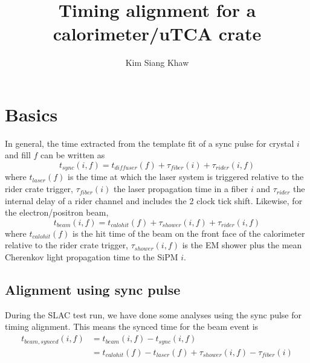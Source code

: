 \documentclass[12pt,letterpaper]{article}
\title{Timing alignment for a calorimeter/uTCA crate}
\author{Kim Siang Khaw}
\begin{document}
\maketitle
{}

\section{Basics}

In general, the time extracted from the template fit of a sync pulse for crystal $i$ and fill $f$ can be written as
%
\begin{equation}
t_{sync}(i,f) = t_{diffuser}(f) + \tau_{fiber}(i) + \tau_{rider}(i,f) \label{eq:tsync}
\end{equation}
%
where $t_{laser}(f)$ is the time at which the laser system is triggered relative to the rider crate trigger, $\tau_{fiber}(i)$ the laser propagation time in a fiber $i$ and $\tau_{rider}$ the internal delay of a rider channel and includes the 2 clock tick shift. Likewise, for the electron/positron beam,
%
\begin{equation}
t_{beam}(i,f) = t_{calohit}(f)  + \tau_{shower}(i,f) + \tau_{rider}(i,f)\label{eq:tbeam}
\end{equation}
%
where $t_{calohit}(f)$ is the hit time of the beam on the front face of the calorimeter relative to the rider crate trigger, $\tau_{shower}(i,f)$ is the EM shower plus the mean Cherenkov light propagation time to the SiPM $i$.

\subsection*{Alignment using sync pulse}
During the SLAC test run, we have done some analyses using the sync pulse for timing alignment.
This means the synced time for the beam event is
%
\begin{align}
t_{beam,synced}(i,f) &=  t_{beam}(i,f) - t_{sync}(i,f) \\
                               &= t_{calohit}(f) - t_{laser}(f) + \tau_{shower}(i,f) - \tau_{fiber}(i)\label{eq:tbeamsync}
\end{align}
\end{document}

